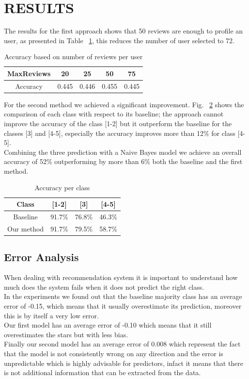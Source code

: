 \documentclass[11pt]{article}
\begin{document}
\section{RESULTS}
The results for the first approach shows that 50 reviews are enough to profile an user, as presented in Table ~\ref{tab}, this reduces the number of user selected to 72.\\
\begin{table}[]
	\centering
	\caption{Accuracy based on number of reviews per user}
	\label{tab}
	\begin{tabular}{|c|c|c|c|c|}
		\hline
		MaxReviews & 20    & 25    & 50    & 75    \\ \hline
		Accuracy   & 0.445 & 0.446 & 0.455 & 0.445 \\ \hline
	\end{tabular}
\end{table}
For the second method we achieved a significant improvement.
Fig. ~\ref{class} shows the comparison of each class with respect to its baseline; the approach cannot improve the accuracy of the class [1-2] but it outperform the baseline for the classes [3] and [4-5], especially the accuracy improves more than 12\% for class [4-5].\\
Combining the three prediction with a Naive Bayes model we achieve an overall accuracy of 52\% outperforming by more than 6\% both the baseline and the first method.
\begin{table}[]
	\centering
	\caption{Accuracy per class}
	\label{class}
	\begin{tabular}{|c|c|c|c|}
		\hline
		Class      & {[}1-2{]} & {[}3{]} & {[}4-5{]} \\ \hline
		Baseline   & 91.7\%    & 76.8\%  & 46.3\%    \\ \hline
		Our method & 91.7\%    & 79.5\%  & 58.7\%    \\ \hline
	\end{tabular}
\end{table}
\subsection{Error Analysis}
When dealing with recommendation system it is important to understand how much does the system fails when it does not predict the right class.\\
In the experiments we found out that the baseline majority class has an average error of -0.15, which means that it usually overestimate its prediction, moreover this is by itself a very low error.\\
Our first model has an average error of -0.10 which means that it still overestimates the stars but with less bias.\\
Finally our second model has an average error of 0.008 which represent the fact that the model is not consistently wrong on any direction and the error is unpredictable which is highly advisable for predictors, infact it means that there is not additional information that can be extracted from the data.
\end{document}
